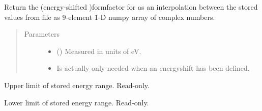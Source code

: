 \documentclass[letterpaper,10pt,english]{sphinxmanual}
\begin{document}
\begin{fulllineitems}
\begin{fulllineitems}
\end{fulllineitems}


\begin{fulllineitems}
\label{\detokenize{modules-api/samplerepresentation:SampleRepresentation.FFfromFile.getFF}}
Return the (energy-shifted )formfactor for  as an interpolation between the stored values from file as 9-element 1-D numpy array of complex numbers.
\begin{quote}\begin{description}
\item[{Parameters}] \leavevmode\begin{itemize}
\item {} 
 () \textendash{} Measured in units of eV.

\item {} 
 \textendash{} Is actually only needed when an energyshift has been defined.

\end{itemize}

\end{description}\end{quote}

\end{fulllineitems}


\begin{fulllineitems}
\label{\detokenize{modules-api/samplerepresentation:SampleRepresentation.FFfromFile.maxE}}
Upper limit of stored energy range. Read-only.

\end{fulllineitems}


\begin{fulllineitems}
\label{\detokenize{modules-api/samplerepresentation:SampleRepresentation.FFfromFile.minE}}
Lower limit of stored energy range. Read-only.

\end{fulllineitems}


\end{fulllineitems}
\end{document}
